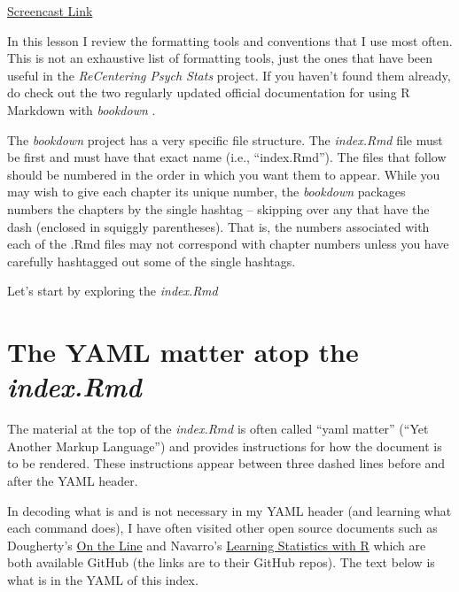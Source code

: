 \documentclass[
]{book}
\begin{document}
\href{https://spu.hosted.panopto.com/Panopto/Pages/Viewer.aspx?pid=430263b6-f1bd-4a8c-a393-adf501447448}{Screencast Link}

In this lesson I review the formatting tools and conventions that I use most often. This is not an exhaustive list of formatting tools, just the ones that have been useful in the \emph{ReCentering Psych Stats} project. If you haven't found them already, do check out the two regularly updated official documentation for using R Markdown with \emph{bookdown} \citep{xie_authoring_2021, xie_r_2021}.

The \emph{bookdown} project has a very specific file structure. The \emph{index.Rmd} file must be first and must have that exact name (i.e., ``index.Rmd''). The files that follow should be numbered in the order in which you want them to appear. While you may wish to give each chapter its unique number, the \emph{bookdown} packages numbers the chapters by the single hashtag -- skipping over any that have the dash (enclosed in squiggly parentheses). That is, the numbers associated with each of the .Rmd files may not correspond with chapter numbers unless you have carefully hashtagged out some of the single hashtags.

Let's start by exploring the \emph{index.Rmd}

\hypertarget{the-yaml-matter-atop-the-index.rmd}{%
\section{\texorpdfstring{The YAML matter atop the \emph{index.Rmd}}{The YAML matter atop the index.Rmd}}\label{the-yaml-matter-atop-the-index.rmd}}

The material at the top of the \emph{index.Rmd} is often called ``yaml matter'' (``Yet Another Markup Language'') and provides instructions for how the document is to be rendered. These instructions appear between three dashed lines before and after the YAML header.

In decoding what is and is not necessary in my YAML header (and learning what each command does), I have often visited other open source documents such as Dougherty's \citeyearpar{dougherty_chapter_2021} \href{https://github.com/OnTheLine/otl-bookdown}{On the Line} and Navarro's \citeyearpar{navarro_book_2020} \href{https://github.com/djnavarro/rbook}{Learning Statistics with R} which are both available GitHub (the links are to their GitHub repos). The text below is what is in the YAML of this index.
\end{document}
